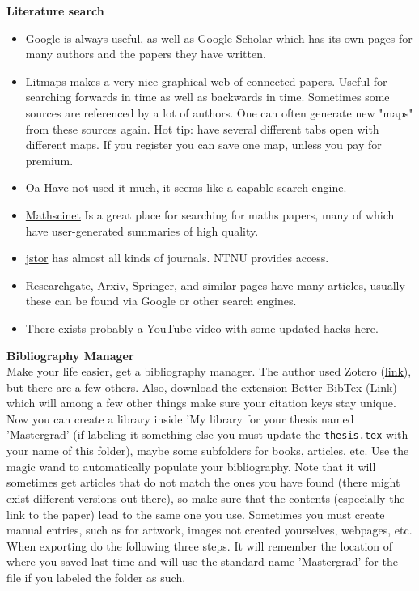 \documentclass[../thesis.tex]{subfiles}
\begin{document}
\textbf{Literature search}
\begin{itemize}
    \item Google is always useful, as well as Google Scholar which has its own pages for many authors and the papers they have written. 
    \item \href{https://www.litmaps.com}{Litmaps} makes a very nice graphical web of connected papers. Useful for searching forwards in time as well as backwards in time. Sometimes some sources are referenced by a lot of authors. One can often generate new "maps" from these sources again. Hot tip: have several different tabs open with different maps. If you register you can save one map, unless you pay for premium.   
    \item \href{https://oa.mg}{Oa} Have not used it much, it seems like a capable search engine.
    \item \href{https://mathscinet.ams.org/mathscinet/publications-search}{Mathscinet} Is a great place for searching for maths papers, many of which have user-generated summaries of high quality.
    \item \href{https://www.jstor.org}{jstor} has almost all kinds of journals. NTNU provides access. 
    \item Researchgate, Arxiv, Springer, and similar pages have many articles, usually these can be found via Google or other search engines.
    \item There exists probably a YouTube video with some updated hacks here. 
\end{itemize}


\textbf{Bibliography Manager}\\
Make your life easier, get a bibliography manager. The author used Zotero (\href{https://www.zotero.org}{link}), but there are a few others. Also, download the extension Better BibTex (\href{https://retorque.re/zotero-better-bibtex/}{Link}) which will among a few other things make sure your citation keys stay unique. Now you can create a library inside 'My library for your thesis named 'Mastergrad' (if labeling it something else you must update the \verb|thesis.tex| with your name of this folder), maybe some subfolders for books, articles, etc. Use the magic wand to automatically populate your bibliography. Note that it will sometimes get articles that do not match the ones you have found (there might exist different versions out there), so make sure that the contents (especially the link to the paper) lead to the same one you use. Sometimes you must create manual entries, such as for artwork, images not created yourselves, webpages, etc. When exporting do the following three steps. It will remember the location of where you saved last time and will use the standard name 'Mastergrad' for the file if you labeled the folder as such. 
\end{document}
